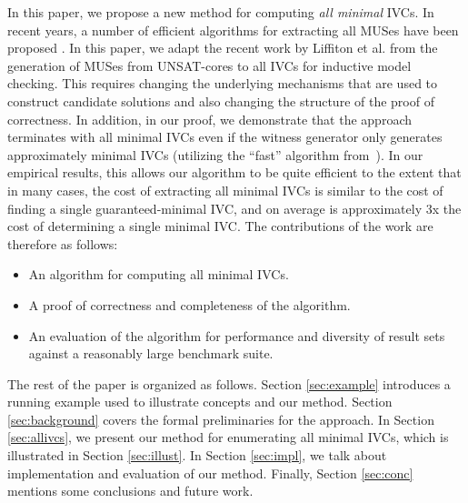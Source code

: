 In this paper, we propose a new method for computing \emph{all minimal} IVCs. In  recent  years,  a  number  of  efficient
algorithms  for  extracting  all MUSes  have  been proposed \cite{Bacchus2016, bacchus2015using, belov2012muser2, belov2013core, belov2012towards, nadel2014accelerated, liffiton2005max}.  In this paper, we adapt the recent work by Liffiton et al. \cite{marco2016fast} from the generation of MUSes from UNSAT-cores to all IVCs for inductive model checking.  This requires changing the underlying mechanisms that are used to construct candidate solutions and also changing the structure of the proof of correctness.  In addition, in our proof, we demonstrate that the approach terminates with all minimal IVCs even if the witness generator only generates approximately minimal IVCs (utilizing the ``fast'' algorithm from~\cite{Ghass16}).  In our empirical results, this allows our algorithm to be quite efficient to the extent that in many cases, the cost of extracting all minimal IVCs is similar to the cost of finding a single guaranteed-minimal IVC, and on average is approximately 3x the cost of determining a single minimal IVC.
The contributions of the work are therefore as follows:
\begin{itemize}
    \item An algorithm for computing all minimal IVCs.
    \item A proof of correctness and completeness of the algorithm.
    \item An evaluation of the algorithm for performance and diversity of result sets against a reasonably large benchmark suite. 
\end{itemize}



The rest of the paper is organized as follows.
Section \ref{sec:example} introduces a running example used to illustrate concepts and our method.
Section \ref{sec:background} covers the formal preliminaries for the approach.
In Section \ref{sec:allivcs}, we present our method for enumerating all minimal IVCs,
which is illustrated in
Section \ref{sec:illust}. In Section \ref{sec:impl}, we talk about implementation and evaluation of our method. Finally, Section \ref{sec:conc} mentions some conclusions and future work. 